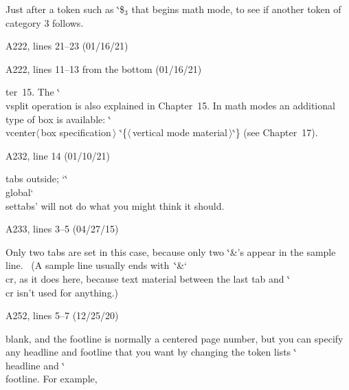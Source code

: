 \ninepoint
\item\bull Just after a token such as \.{\char`\$}$_3$
that begins math mode, to see if
another token of category 3 follows.

\bugonpage A222, lines 21--23 (01/16/21)

\ninepoint
{}

\bugonpage A222, lines 11--13 from the bottom (01/16/21)

\ninepoint\noindent
ter~15. The \.{\char`\\vsplit} operation
is also explained in Chapter~15. In math modes an additional
type of box is available:
\.{\char`\\vcenter}$\langle\,$box specification$\,\rangle$%
 \.{\char`\{}$\langle\,$vertical mode material$\,\rangle$\.{\char`\}}
(see Chapter~17).

\bugonpage A232, line 14 (01/10/21)

\ninepoint\noindent
tabs outside; `\.{\char`\\global\char`\\settabs}' will not do what
you might think it should.

\bugonpage A233, lines 3--5 (04/27/15)

\tenpoint\noindent
Only two tabs are set in this case, because only two \.{\char`\&}'s
appear in the sample line. \ (A sample line usually
ends with~\.{\char`\&\char`\\cr}, as it does here,
because text material between the last tab and \.{\char`\\cr}
isn't used for anything.)

\bugonpage A252, lines 5--7 (12/25/20)

\ninepoint\noindent
blank, and
the footline is normally a centered page number, but you can specify any
headline and footline that you want by changing the token lists
\.{\char`\\headline} and \.{\char`\\footline}. For example,

